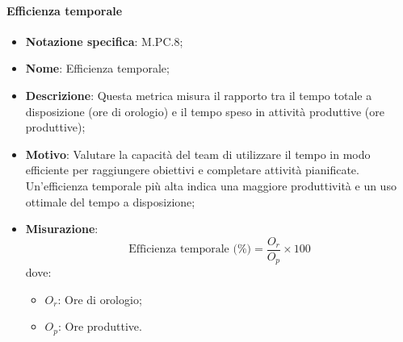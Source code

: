 \paragraph*{Efficienza temporale}
\begin{itemize}
    \item \textbf{Notazione specifica}: M.PC.8;
    \item \textbf{Nome}: Efficienza temporale;
    \item \textbf{Descrizione}: Questa metrica misura il rapporto tra il tempo totale a disposizione (ore di orologio) e il tempo speso in attività produttive (ore produttive);
    \item \textbf{Motivo}: Valutare la capacità del team di utilizzare il tempo in modo efficiente per raggiungere obiettivi e completare attività pianificate. Un'efficienza temporale più alta indica una maggiore produttività e un uso ottimale del tempo a disposizione;
    \item \textbf{Misurazione}:
    \[
        \text{Efficienza temporale (\%)} = \frac{O_r}{O_p} \times 100
    \]
    dove:
    \begin{itemize}
        \item $O_{r}$: Ore di orologio;
        \item $O_{p}$: Ore produttive.
    \end{itemize}
\end{itemize}
